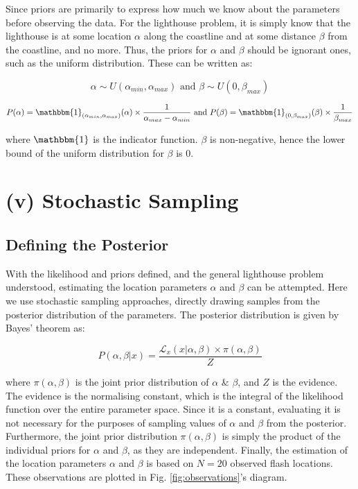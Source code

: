 \documentclass[12pt]{report} %
\begin{document}
Since priors are primarily to express how much we know about the parameters before observing the data. For the lighthouse problem, it is simply know that the lighthouse is at some location $\alpha$ along the coastline and at some distance $\beta$ from the coastline, and no more. Thus, the priors for $\alpha$ and $\beta$ should be ignorant ones, such as the uniform distribution. These can be written as:

\begin{equation}
    \alpha \sim U(\alpha_{min}, \alpha_{max}) \text{ and } \beta \sim U(0, \beta_{max})
\end{equation}

\begin{equation}
    P(\alpha) = \mathbbm{1}_{(\alpha_{min}, \alpha_{max})}(\alpha) \times \frac{1}{\alpha_{max} - \alpha_{min}} \text{ and } P(\beta) = \mathbbm{1}_{(0, \beta_{max})}(\beta) \times \frac{1}{\beta_{max}}
\end{equation}

where $\mathbbm{1}$ is the indicator function. $\beta$ is non-negative, hence the lower bound of the uniform distribution for $\beta$ is 0.


\chapter{(v) Stochastic Sampling }

\section{Defining the Posterior}

With the likelihood and priors defined, and the general lighthouse problem understood, estimating the location parameters $\alpha$ and $\beta$ can be attempted. Here we use stochastic sampling approaches, directly drawing samples from the posterior distribution of the parameters. The posterior distribution is given by Bayes' theorem as:

\begin{equation}
    P(\alpha, \beta | x) = \frac{\mathcal{L}_{x}(x | \alpha, \beta) \times \pi(\alpha,\beta)}{Z}
\end{equation}

where $\pi(\alpha,\beta)$ is the joint prior distribution of $\alpha$ \& $\beta$, and $Z$ is the evidence. The evidence is the normalising constant, which is the integral of the likelihood function over the entire parameter space. Since it is a constant, evaluating it is not necessary for the purposes of sampling values of $\alpha$ and $\beta$ from the posterior. Furthermore, the joint prior distribution $\pi(\alpha,\beta)$ is simply the product of the individual priors for $\alpha$ and $\beta$, as they are independent. Finally, the estimation of the location parameters $\alpha$ and $\beta$ is based on $N = 20$ observed flash locations. These observations are plotted in Fig. \ref{fig:observations}'s diagram.
\end{document}
